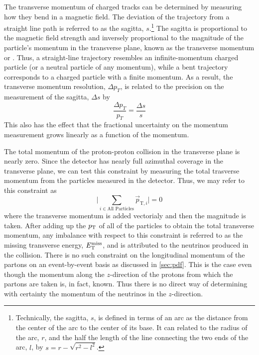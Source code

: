 The transverse momentum of charged tracks can be determined by measuring how they 
bend in a magnetic field. The deviation of the trajectory
from a straight line path is referred to as the 
sagitta, $s$.\footnote{Technically, the sagitta, $s$, is defined in terms
of an arc as the distance from the center of the arc to the center of its
base. It can related to the radius of the arc, $r$, and the half the length
of the line connecting the two ends of the arc, $l$, by 
$s=r-\sqrt{r^2-l^2}$.} The sagitta is proportional to the magnetic
field strength and inversely proportional to the magnitude
of the particle's momentum in the transverse plane, known
as the transverse momentum or \pt.
Thus, a straight-line trajectory resembles an infinite-momentum charged
particle (or a neutral particle of any momentum), while
a bent trajectory corresponds to a charged particle with a finite momentum.
As a result, the transverse momentum resolution, $\Delta p_T$, is related to the 
precision on the measurement of the sagitta, $\Delta s$ by
\begin{equation}
\frac{\Delta p_T }{p_T} = \frac{\Delta s}{s}
\label{eq:sagitta}
\end{equation}
This also has the effect that the fractional uncertainty on the momentum
measurement grows linearly as a function of the momentum.


The total momentum of the proton-proton collision in the transverse
plane is nearly zero. Since the detector has nearly full azimuthal coverage 
in the transverse plane, we can test this constraint by measuring
the total trasverse momentum from the particles measured in the detector.
Thus, we may refer to this constraint as
\begin{equation}
\Bigg| \sum_{i\in\textrm{All Particles}} \vec{p}_{\textrm{T},i} \Bigg| = 0
\end{equation}
where the transverse momentum is added vectorialy and then
the magnitude is taken.
After adding up the $p_{\mathrm{T}}$ of all of the particles to obtain
the total transverse momentum, 
any imbalance with respect to this constraint
is referred to as the
missing transverse energy, $E_{\mathrm{T}}^{\mathrm{miss}}$, and is attributed to the 
neutrinos produced in the collision. 
There is no such constraint on the longitudinal momentum of the partons
on an event-by-event basis
as discussed in \sec\ref{sec:pdf}.
This is the case
even though the momentum along the $z$-direction of the 
protons from which the partons are taken is, in fact, known.
Thus there is no direct way of determining with certainty the 
momentum of the neutrinos in the $z$-direction.



